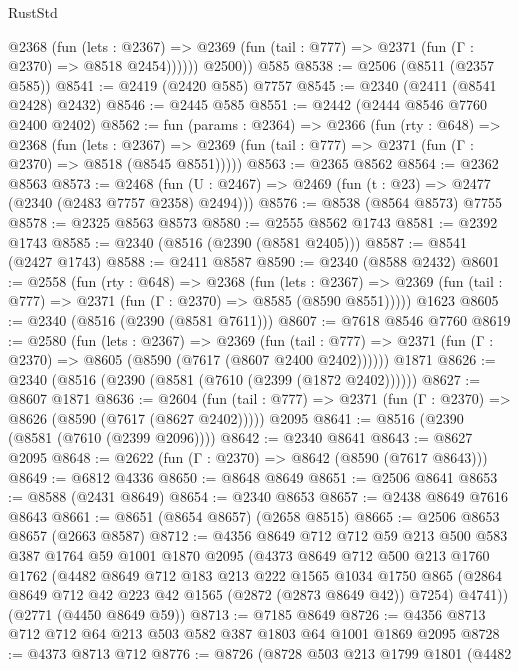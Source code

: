 \begin{lexlean}{RustStd}
\begin{coremodule}
            @2368
              (fun (lets : @2367) =>
              @2369 (fun (tail : @777) => @2371 (fun (Γ : @2370) => @8518 @2454))))))
        @2500))
    @585
@8538 := @2506 (@8511 (@2357 @585))
@8541 := @2419 (@2420 @585) @7757
@8545 := @2340 (@2411 (@8541 @2428) @2432)
@8546 := @2445 @585
@8551 := @2442 (@2444 @8546 @7760 @2400 @2402)
@8562 := fun (params : @2364) =>
  @2366
    (fun (rty : @648) =>
    @2368
      (fun (lets : @2367) =>
      @2369 (fun (tail : @777) => @2371 (fun (Γ : @2370) => @8518 (@8545 @8551)))))
@8563 := @2365 @8562
@8564 := @2362 @8563
@8573 := @2468 (fun (U : @2467) => @2469 (fun (t : @23) => @2477 (@2340 (@2483 @7757 @2358) @2494)))
@8576 := @8538 (@8564 @8573) @7755
@8578 := @2325 @8563 @8573
@8580 := @2555 @8562 @1743
@8581 := @2392 @1743
@8585 := @2340 (@8516 (@2390 (@8581 @2405)))
@8587 := @8541 (@2427 @1743)
@8588 := @2411 @8587
@8590 := @2340 (@8588 @2432)
@8601 := @2558
    (fun (rty : @648) =>
    @2368
      (fun (lets : @2367) =>
      @2369 (fun (tail : @777) => @2371 (fun (Γ : @2370) => @8585 (@8590 @8551)))))
    @1623
@8605 := @2340 (@8516 (@2390 (@8581 @7611)))
@8607 := @7618 @8546 @7760
@8619 := @2580
    (fun (lets : @2367) =>
    @2369
      (fun (tail : @777) => @2371 (fun (Γ : @2370) => @8605 (@8590 (@7617 (@8607 @2400 @2402))))))
    @1871
@8626 := @2340 (@8516 (@2390 (@8581 (@7610 (@2399 (@1872 @2402))))))
@8627 := @8607 @1871
@8636 := @2604
    (fun (tail : @777) => @2371 (fun (Γ : @2370) => @8626 (@8590 (@7617 (@8627 @2402)))))
    @2095
@8641 := @8516 (@2390 (@8581 (@7610 (@2399 @2096))))
@8642 := @2340 @8641
@8643 := @8627 @2095
@8648 := @2622 (fun (Γ : @2370) => @8642 (@8590 (@7617 @8643)))
@8649 := @6812 @4336
@8650 := @8648 @8649
@8651 := @2506 @8641
@8653 := @8588 (@2431 @8649)
@8654 := @2340 @8653
@8657 := @2438 @8649 @7616 @8643
@8661 := @8651 (@8654 @8657) (@2658 @8515)
@8665 := @2506 @8653 @8657 (@2663 @8587)
@8712 := @4356
    @8649
    @712
    @712
    @59
    @213
    @500
    @583
    @387
    @1764
    @59
    @1001
    @1870
    @2095
    (@4373
      @8649
      @712
      @500
      @213
      @1760
      @1762
      (@4482
        @8649
        @712
        @183
        @213
        @222
        @1565
        @1034
        @1750
        @865
        (@2864 @8649 @712 @42 @223 @42 @1565 (@2872 (@2873 @8649 @42)) @7254)
        @4741))
    (@2771 (@4450 @8649 @59))
@8713 := @7185 @8649
@8726 := @4356 @8713 @712 @712 @64 @213 @503 @582 @387 @1803 @64 @1001 @1869 @2095
@8728 := @4373 @8713 @712
@8776 := @8726
    (@8728
      @503
      @213
      @1799
      @1801
      (@4482

\end{coremodule}
\end{lexlean}
